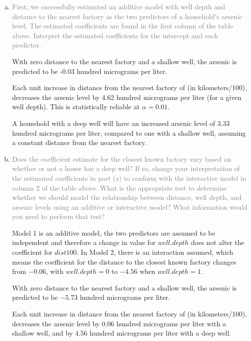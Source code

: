 \documentclass[12pt,letterpaper]{article}
\begin{document}
  \begin{enumerate}[(a)]
    \item \textcolor{gray}{First, we successfully estimated an additive model with well depth and distance to
the nearest factory as the two predictors of a household's arsenic level. The estimated
coefficients are found in the first column of the table above. Interpret the estimated
coefficients for the intercept and each predictor.}

    With zero distance to the nearest factory and a shallow well, the arsenic is predicted to be -0.03 hundred micrograms per liter.
    
    Each unit increase in distance from the nearest factory of (in kilometers/100), decreases the arsenic level by 4.62 hundred micrograms per liter (for a given well depth).  This is statistically reliable at $\alpha = 0.01$.
    
    A household with a deep well will have an increased arsenic level of 3.33 hundred micrograms per liter, compared to one with a shallow well, assuming a constant distance from the nearest factory.

    \item \textcolor{gray}{Does the coefficient estimate for the closest known factory vary based on whether or not
a house has a deep well? If so, change your interpretation of the estimated coefficients
in part (a) to conform with the interactive model in column 2 of the table above. What
is the appropriate test to determine whether we should model the relationship between
distance, well depth, and arsenic levels using an additive or interactive model? What
information would you need to perform that test?}

    Model 1 is an additive model, the two predictors are assumed to be independent and therefore a change in value for $well.depth$ does not alter the coefficient for $dist100$.  In Model 2, there is an interaction assumed, which means the coefficient for the distance to the closest known factory changes from $-0.06$, with $well.depth=0$ to $-4.56$ when $well.depth=1$.  
    
    With zero distance to the nearest factory and a shallow well, the arsenic is predicted to be $-5.73$ hundred micrograms per liter.
    
    Each unit increase in distance from the nearest factory of (in kilometers/100), decreases the arsenic level by 0.06 hundred micrograms per liter with a shallow well, and by 4.56 hundred micrograms per liter with a deep well. 
    

\end{enumerate}
\end{document}
